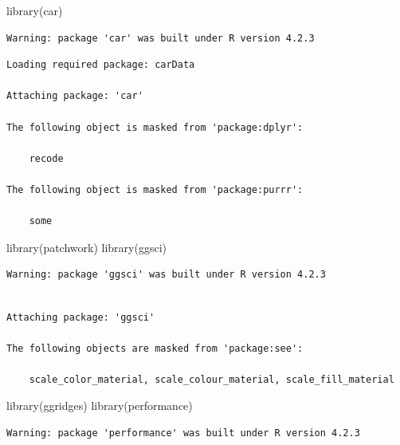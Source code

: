 \documentclass[
  letterpaper,
  DIV=11,
  numbers=noendperiod]{scrartcl}
\newenvironment{Shaded}{\begin{snugshade}}{\end{snugshade}}
\newcommand{\FunctionTok}[1]{\textcolor[rgb]{0.28,0.35,0.67}{#1}}
\newcommand{\NormalTok}[1]{\textcolor[rgb]{0.00,0.23,0.31}{#1}}
\begin{document}
\begin{Shaded}
\begin{Highlighting}[]
\FunctionTok{library}\NormalTok{(car)}
\end{Highlighting}
\end{Shaded}

\begin{verbatim}
Warning: package 'car' was built under R version 4.2.3
\end{verbatim}

\begin{verbatim}
Loading required package: carData

Attaching package: 'car'

The following object is masked from 'package:dplyr':

    recode

The following object is masked from 'package:purrr':

    some
\end{verbatim}

\begin{Shaded}
\begin{Highlighting}[]
\FunctionTok{library}\NormalTok{(patchwork)}
\FunctionTok{library}\NormalTok{(ggsci)}
\end{Highlighting}
\end{Shaded}

\begin{verbatim}
Warning: package 'ggsci' was built under R version 4.2.3
\end{verbatim}

\begin{verbatim}

Attaching package: 'ggsci'

The following objects are masked from 'package:see':

    scale_color_material, scale_colour_material, scale_fill_material
\end{verbatim}

\begin{Shaded}
\begin{Highlighting}[]
\FunctionTok{library}\NormalTok{(ggridges)}
\FunctionTok{library}\NormalTok{(performance)}
\end{Highlighting}
\end{Shaded}

\begin{verbatim}
Warning: package 'performance' was built under R version 4.2.3
\end{verbatim}
\end{document}
